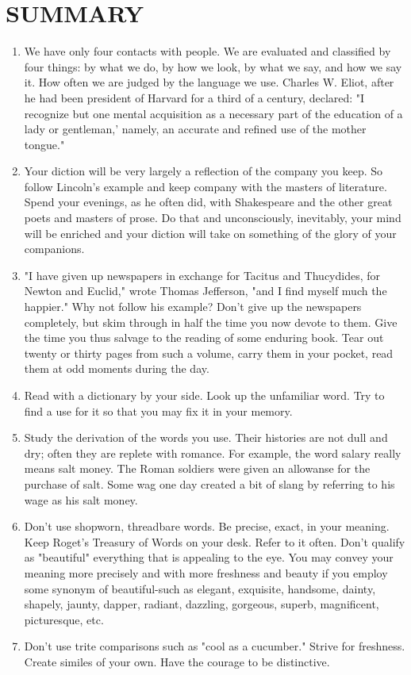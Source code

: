 \documentclass[10pt]{article}
\begin{document}
\section*{SUMMARY}
\begin{enumerate}
  \item We have only four contacts with people. We are evaluated and classified by four things: by what we do, by how we look, by what we say, and how we say it. How often we are judged by the language we use. Charles W. Eliot, after he had been president of Harvard for a third of a century, declared: "I recognize but one mental acquisition as a necessary part of the education of a lady or gentleman,' namely, an accurate and refined use of the mother tongue."
  \item Your diction will be very largely a reflection of the company you keep. So follow Lincoln's example and keep company with the masters of literature. Spend your evenings, as he often did, with Shakespeare and the other great poets and masters of prose. Do that and unconsciously, inevitably, your mind will be enriched and your diction will take on something of the glory of your companions.
  \item "I have given up newspapers in exchange for Tacitus and Thucydides, for Newton and Euclid," wrote Thomas Jefferson, "and I find myself much the happier." Why not follow his example? Don't give up the newspapers completely, but skim through in half the time you now devote to them. Give the time you thus salvage to the reading of some enduring book. Tear out twenty or thirty pages from such a volume, carry them in your pocket, read them at odd moments during the day.
  \item Read with a dictionary by your side. Look up the unfamiliar word. Try to find a use for it so that you may fix it in your memory.
  \item Study the derivation of the words you use. Their histories are not dull and dry; often they are replete with romance. For example, the word salary really means salt money. The Roman soldiers were given an allowanse for the purchase of salt. Some wag one day created a bit of slang by referring to his wage as his salt money.
  \item Don't use shopworn, threadbare words. Be precise, exact, in your meaning. Keep Roget's Treasury of Words on your desk. Refer to it often. Don't qualify as "beautiful" everything that is appealing to the eye. You may convey your meaning more precisely and with more freshness and beauty if you employ some synonym of beautiful-such as elegant, exquisite, handsome, dainty, shapely, jaunty, dapper, radiant, dazzling, gorgeous, superb, magnificent, picturesque, etc.
  \item Don't use trite comparisons such as "cool as a cucumber." Strive for freshness. Create similes of your own. Have the courage to be distinctive.
\end{enumerate}
\end{document}
